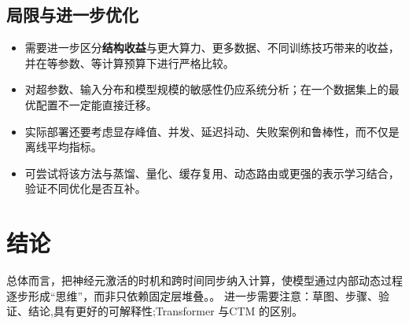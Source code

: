 \documentclass[UTF8,11pt,a4paper]{ctexart}
\newcommand{\term}[1]{\textbf{\textcolor{mainblue}{#1}}}
\begin{document}
\subsection{局限与进一步优化}
\begin{itemize}
\item 需要进一步区分\term{结构收益}与更大算力、更多数据、不同训练技巧带来的收益，并在等参数、等计算预算下进行严格比较。
\item 对超参数、输入分布和模型规模的敏感性仍应系统分析；在一个数据集上的最优配置不一定能直接迁移。
\item 实际部署还要考虑显存峰值、并发、延迟抖动、失败案例和鲁棒性，而不仅是离线平均指标。
\item 可尝试将该方法与蒸馏、量化、缓存复用、动态路由或更强的表示学习结合，验证不同优化是否互补。
\end{itemize}

\section{结论}
总体而言，把神经元激活的时机和跨时间同步纳入计算，使模型通过内部动态过程逐步形成“思维”，而非只依赖固定层堆叠。。 进一步需要注意：草图、步骤、验证、结论,具有更好的可解释性;Transformer 与CTM 的区别。
\end{document}
